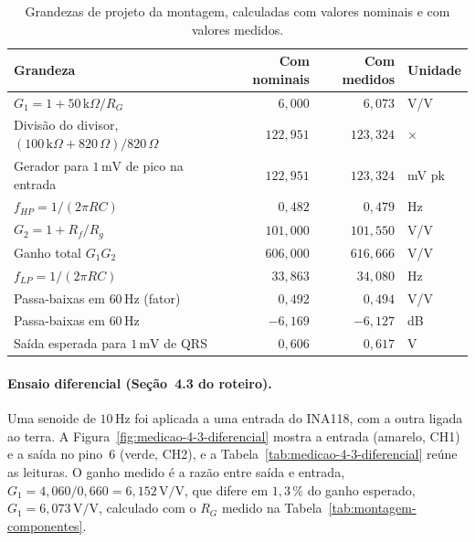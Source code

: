 \documentclass[11pt,a4paper]{article}
\begin{document}
\begin{table}[H]
\centering
\caption{Grandezas de projeto da montagem, calculadas com valores nominais e com valores medidos.}
\label{tab:montagem-projeto}
\begin{tabular}{@{}lrrl@{}}
\toprule
\textbf{Grandeza} & \textbf{Com nominais} & \textbf{Com medidos} & \textbf{Unidade} \\
\midrule
\(G_1 = 1 + 50\,\text{k}\Omega/R_G\) & \(6{,}000\) & \(6{,}073\) & V/V \\
Divisão do divisor, \((100\,\text{k}\Omega + 820\,\Omega)/820\,\Omega\) & \(122{,}951\) & \(123{,}324\) & \(\times\) \\
Gerador para \(1\,\text{mV}\) de pico na entrada & \(122{,}951\) & \(123{,}324\) & mV pk \\
\(f_{HP} = 1/(2\pi R C)\) & \(0{,}482\) & \(0{,}479\) & Hz \\
\(G_2 = 1 + R_f/R_g\) & \(101{,}000\) & \(101{,}550\) & V/V \\
Ganho total \(G_1 G_2\) & \(606{,}000\) & \(616{,}666\) & V/V \\
\(f_{LP} = 1/(2\pi R C)\) & \(33{,}863\) & \(34{,}080\) & Hz \\
Passa-baixas em \(60\,\text{Hz}\) (fator) & \(0{,}492\) & \(0{,}494\) & V/V \\
Passa-baixas em \(60\,\text{Hz}\) & \(-6{,}169\) & \(-6{,}127\) & dB \\
Saída esperada para \(1\,\text{mV}\) de QRS & \(0{,}606\) & \(0{,}617\) & V \\
\bottomrule
\end{tabular}
\end{table}

\paragraph{Ensaio diferencial (Seção~4.3 do roteiro).} Uma senoide de \(10\,\text{Hz}\) foi aplicada a uma entrada do INA118, com a outra ligada ao terra. A Figura~\ref{fig:medicao-4-3-diferencial} mostra a entrada (amarelo, CH1) e a saída no pino~6 (verde, CH2), e a Tabela~\ref{tab:medicao-4-3-diferencial} reúne as leituras. O ganho medido é a razão entre saída e entrada, \(G_1 = 4{,}060/0{,}660 = 6{,}152\,\text{V/V}\), que difere em \(1{,}3\,\%\) do ganho esperado, \(G_1 = 6{,}073\,\text{V/V}\), calculado com o \(R_G\) medido na Tabela~\ref{tab:montagem-componentes}.
\end{document}
